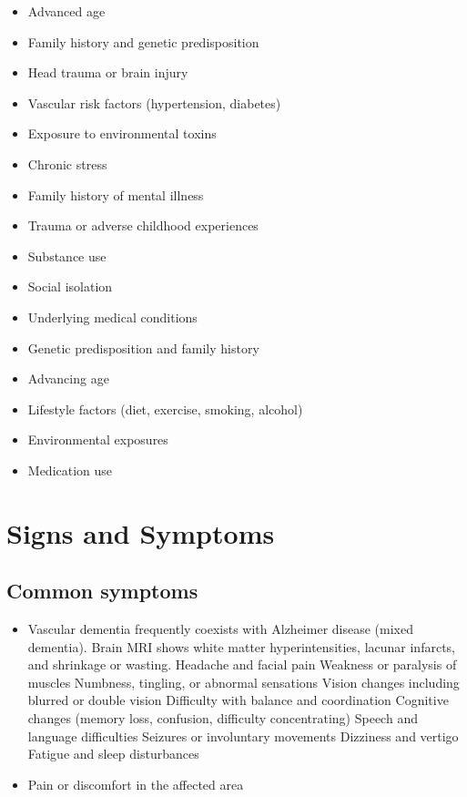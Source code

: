 \begin{itemize}[noitemsep]
  \item Advanced age
  \item Family history and genetic predisposition
  \item Head trauma or brain injury
  \item Vascular risk factors (hypertension, diabetes)
  \item Exposure to environmental toxins
  \item Chronic stress
  \item Family history of mental illness
  \item Trauma or adverse childhood experiences
  \item Substance use
  \item Social isolation
  \item Underlying medical conditions
  \item Genetic predisposition and family history
  \item Advancing age
  \item Lifestyle factors (diet, exercise, smoking, alcohol)
  \item Environmental exposures
  \item Medication use
\end{itemize}
\section{Signs and Symptoms}

\subsection{Common symptoms}
\begin{itemize}[noitemsep]
  \item Vascular dementia frequently coexists with Alzheimer disease (mixed dementia). Brain MRI shows white matter hyperintensities, lacunar infarcts, and shrinkage or wasting. Headache and facial pain Weakness or paralysis of muscles Numbness, tingling, or abnormal sensations Vision changes including blurred or double vision Difficulty with balance and coordination Cognitive changes (memory loss, confusion, difficulty concentrating) Speech and language difficulties Seizures or involuntary movements Dizziness and vertigo Fatigue and sleep disturbances

  \item Pain or discomfort in the affected area
  \end{itemize}

